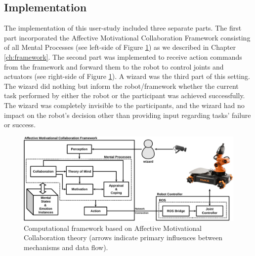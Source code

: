 \documentclass[12pt]{report}
\begin{document}
% 
% 
% 
% 
\subsection{Implementation}
The implementation of this user-study included three separate parts. The first
part incorporated the Affective Motivational Collaboration Framework consisting
of all Mental Processes (see left-side of Figure \ref{fig:framework}) as we
described in Chapter \ref{ch:framework}. The second part was implemented to
receive action commands from the framework and forward them to the robot to
control joints and actuators (see right-side of Figure \ref{fig:framework}).
A wizard was the third part of this setting. The wizard did nothing but inform
the robot/framework whether the current task performed by either the robot or
the participant was achieved successfully. The wizard was completely invisible
to the participants, and the wizard had no impact on the robot's decision other
than providing input regarding tasks' failure or success.

\begin{figure}[tbh]
  \centering
  \includegraphics[width=\textwidth]{figure/framework-croped.pdf}
  \caption{Computational framework based on Affective Motivational Collaboration
  theory (arrows indicate primary influences between mechanisms and data flow).}
  \label{fig:framework}
\end{figure}
\end{document}
